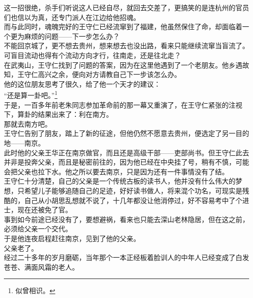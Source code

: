 \begin{multicols}{\theparacolNo}
这一招很绝，杀手们听说这人已经自尽，就回去交差了，更搞笑的是连杭州的官员们也信以为真，还专门派人在江边给他招魂。\\

而与此同时，魂魄完好的王守仁已经流窜到了福建，他虽然保住了命，却面临着一个更为麻烦的问题——下一步怎么办？\\

不能回京城了，更不想去贵州，想来想去也没出路，看来只能继续流窜当盲流了。\\

可盲目流动也得有个流动方向才行，往南走，还是往北走？\\

在武夷山，王守仁找到了问题的答案，因为在这里他遇到了一个老朋友。他乡遇故知，王守仁高兴之余，便向对方请教自己下一步该怎么办。\\

他的这位朋友思考了很久，给了他一个天才的建议：\\

“还是算一卦吧。”\footnote{似曾相识。}\\

于是，一百多年前老朱同志参加革命前的那一幕又重演了，在王守仁紧张的注视下，算卦的结果出来了：利在南方。\\

那就去南方吧。\\

王守仁告别了朋友，踏上了新的征途，但他仍然不愿意去贵州，便选定了另一目的地——南京。\\

此时他的父亲王华正在南京做官，而且还是高级干部——吏部尚书。但王守仁此去并非是投奔父亲，而且是秘密前往的，因为他已经在中央挂了号，稍有不慎，可能会把父亲也拉下水。他之所以要去南京，只是因为还有一件事情没有了结。\\

王守仁十分清楚，自己的父亲是一个传统古板的读书人，他并没有什么伟大的梦想，只希望儿子能够追随自己的足迹，好好读书做人，将来混个功名，可现实是残酷的，自己从小胡思乱想就不说了，十几年都没让他消停过，好不容易考中了个进士，现在还被免了官。\\

事到如今前途已经没有了，要想避祸，看来也只能去深山老林隐居，但在这之前，必须给父亲一个交代。\\

于是他连夜启程赶往南京，见到了他的父亲。\\

父亲老了。\\

经过二十多年的岁月磨砺，当年那个一本正经板着脸训人的中年人已经变成了白发苍苍、满面风霜的老人。\\


\end{multicols}
